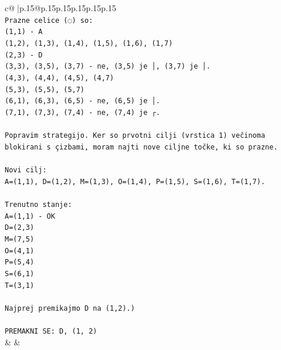 \documentclass{article}
\begin{document}
{\begin{supertabular}{c@{$\;$}|p{.15\linewidth}@{}p{.15\linewidth}p{.15\linewidth}p{.15\linewidth}p{.15\linewidth}p{.15\linewidth}}
{{{\\ 
\texttt{Prazne celice (◌) so:} \\
\texttt{(1,1) {-} A} \\
\texttt{(1,2), (1,3), (1,4), (1,5), (1,6), (1,7)} \\
\texttt{(2,3) {-} D} \\
\texttt{(3,3), (3,5), (3,7) {-} ne, (3,5) je │, (3,7) je │.} \\
\texttt{(4,3), (4,4), (4,5), (4,7)} \\
\texttt{(5,3), (5,5), (5,7)} \\
\texttt{(6,1), (6,3), (6,5) {-} ne, (6,5) je │.} \\
\texttt{(7,1), (7,3), (7,4) {-} ne, (7,4) je ┌.} \\
\\ 
\texttt{Popravim strategijo. Ker so prvotni cilji (vrstica 1) večinoma blokirani s çizbami, moram najti nove ciljne točke, ki so prazne.} \\
\\ 
\texttt{Novi cilj:} \\
\texttt{A=(1,1), D=(1,2), M=(1,3), O=(1,4), P=(1,5), S=(1,6), T=(1,7).} \\
\\ 
\texttt{Trenutno stanje:} \\
\texttt{A=(1,1) {-} OK} \\
\texttt{D=(2,3)} \\
\texttt{M=(7,5)} \\
\texttt{O=(4,1)} \\
\texttt{P=(5,4)} \\
\texttt{S=(6,1)} \\
\texttt{T=(3,1)} \\
\\ 
\texttt{Najprej premikajmo D na (1,2).)} \\
\\ 
\texttt{PREMAKNI SE: D, (1, 2)} \\
            }
        }
    }
    & & \\ \\


\end{supertabular}}
\end{document}
